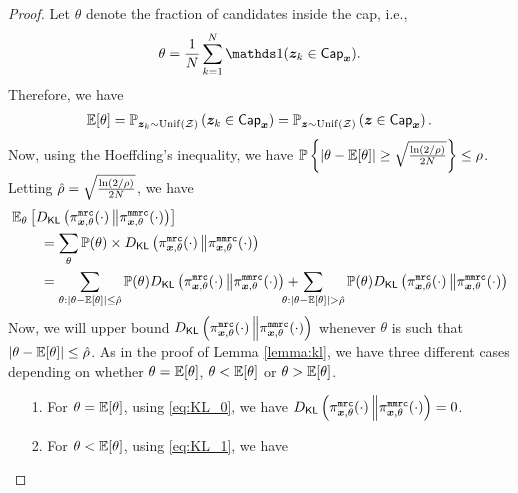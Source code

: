 \begin{proof}
Let $\theta$ denote the fraction of candidates inside the cap, i.e.,
\begin{align}
\theta = \dfrac{1}{N} \sum_{k =1}^{N} \Indicator(\svbz_k \in \msf{Cap}_{\svbx}).
\end{align}
Therefore, we have
\begin{align}
\mathbb{E}[\theta] = \mathbb{P}_{{\boldsymbol{z}}_k \sim \mathrm{Unif}(\mathcal{Z})}\left( {\boldsymbol{z}}_k \in \mathsf{Cap}_{{\boldsymbol{x}}} \right) = \mathbb{P}_{{\boldsymbol{z}} \sim \mathrm{Unif}(\mathcal{Z})}\left( {\boldsymbol{z}} \in \mathsf{Cap}_{{\boldsymbol{x}}} \right). \label{eq:expec_prob_rel}
\end{align}
Now, using the Hoeffding's inequality, we have $\mathbb{P}\left\{ \left\lvert \theta- \mathbb{E}[\theta] \right\rvert \geq \sqrt{\frac{\ln\left( 2/\rho \right)}{2N}} \right\} \leq \rho$. Letting $\hat{\rho} = \sqrt{\frac{\ln\left( 2/\rho \right)}{2N}}$, we have
\begin{align}
    & \Expectation_{\theta}\lb\KLD{\piMRC_{\svbx, \theta}(\cdot)}{\piMMRC_{\svbx, \theta}(\cdot)}\rb \\
    & \qquad = \sum_{\theta} \Probability(\theta) \times \KLD{\piMRC_{\svbx, \theta}(\cdot)}{\piMMRC_{\svbx, \theta}(\cdot)}\\
    & \qquad = \sum_{\theta : \lba \theta- \E[\theta] \rba \leq \hat{\rho}} \Probability(\theta) \KLD{\piMRC_{\svbx, \theta}(\cdot)}{\piMMRC_{\svbx, \theta}(\cdot)} +  \hspace{-5mm} \sum_{\theta : \lba \theta- \E[\theta] \rba > \hat{\rho}} \Probability(\theta) \KLD{\piMRC_{\svbx, \theta}(\cdot)}{\piMMRC_{\svbx, \theta}(\cdot)}
    \label{eq:expected_kl_1}
\end{align}
Now, we will upper bound ${D}_{\mathsf{KL}}\left( \pi^{\texttt{mrc}}_{{\boldsymbol{x}}, \theta}(\cdot)\, \middle\Vert \pi^{\texttt{mmrc}}_{{\boldsymbol{x}}, \theta}(\cdot) \right)$ whenever $\theta$ is such that $\left\lvert \theta- \mathbb{E}[\theta] \right\rvert \leq \hat{\rho}$. As in the proof of Lemma \ref{lemma:kl}, we have three different cases depending on whether $\theta = \mathbb{E}[\theta]$, $\theta < \mathbb{E}[\theta]$ or $\theta > \mathbb{E}[\theta]$. 
\begin{enumerate}
\item[1.]  For $\theta = \mathbb{E}[\theta]$, using \eqref{eq:KL_0}, we have ${D}_{\mathsf{KL}}\left( \pi^{\texttt{mrc}}_{{\boldsymbol{x}}, \theta}(\cdot)\, \middle\Vert \pi^{\texttt{mmrc}}_{{\boldsymbol{x}}, \theta}(\cdot) \right) = 0$. 
\item[2.]
For $\theta < \mathbb{E}[\theta]$, using \eqref{eq:KL_1}, we have

\end{enumerate}
\end{proof}
